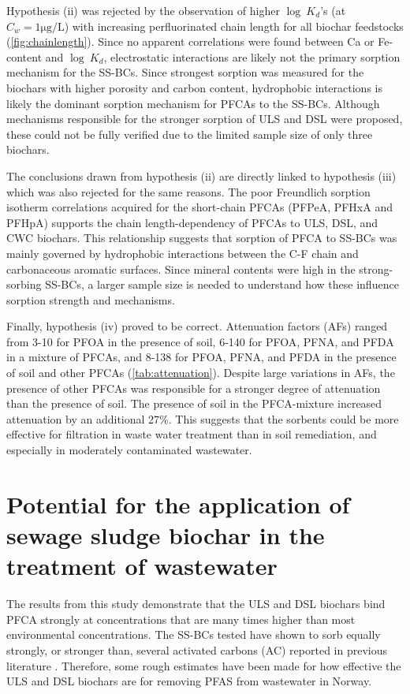 Hypothesis (ii) was rejected by the observation of higher $\log~K_d$'s (at $C_w = 1 \mathrm{\mu g/L}$) with increasing perfluorinated chain length for all biochar feedstocks (\cref{fig:chainlength}). Since no apparent correlations were found between Ca or Fe-content and $\log~K_d$, electrostatic interactions are likely not the primary sorption mechanism for the SS-BCs. Since strongest sorption was measured for the biochars with higher porosity and carbon content, hydrophobic interactions is likely the dominant sorption mechanism for PFCAs to the SS-BCs. Although mechanisms responsible for the stronger sorption of ULS and DSL were proposed, these could not be fully verified due to the limited sample size of only three biochars. 

The conclusions drawn from hypothesis (ii) are directly linked to hypothesis (iii) which was also rejected for the same reasons. The poor Freundlich sorption isotherm correlations acquired for the short-chain PFCAs (PFPeA, PFHxA and PFHpA) supports the chain length-dependency of PFCAs to ULS, DSL, and CWC biochars. This relationship suggests that sorption of PFCA to SS-BCs was mainly governed by hydrophobic interactions between the C-F chain and carbonaceous aromatic surfaces. Since mineral contents were high in the strong-sorbing SS-BCs, a larger sample size is needed to understand how these influence sorption strength and mechanisms. 

Finally, hypothesis (iv) proved to be correct. Attenuation factors (AFs) ranged from 3-10 for PFOA in the presence of soil, 6-140 for PFOA, PFNA, and PFDA in a mixture of PFCAs, and 8-138 for PFOA, PFNA, and PFDA in the presence of soil and other PFCAs (\cref{tab:attenuation}). Despite large variations in AFs, the presence of other PFCAs was responsible for a stronger degree of attenuation than the presence of soil. The presence of soil in the PFCA-mixture increased attenuation by an additional 27\%. This suggests that the sorbents could be more effective for filtration in waste water treatment than in soil remediation, and especially in moderately contaminated wastewater. 

\section{Potential for the application of sewage sludge biochar in the treatment of wastewater \label{sec:application}}
The results from this study demonstrate that the ULS and DSL biochars bind PFCA strongly at concentrations that are many times higher than most environmental concentrations. The SS-BCs tested have shown to sorb equally strongly, or stronger than, several activated carbons (AC) reported in previous literature \citep{Kupryianchyk2016b, hansen2010sorption, silvani2019can}. Therefore, some rough estimates have been made for how effective the ULS and DSL biochars are for removing PFAS from wastewater in Norway. 

